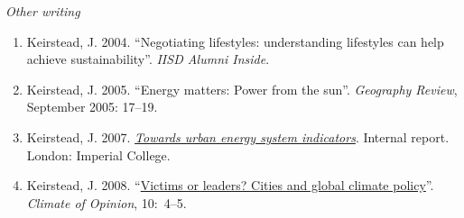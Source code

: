 \documentclass[11pt,a4paper]{article}
\begin{document}
\emph{Other writing}

\begin{enumerate}
\item Keirstead, J. 2004. ``Negotiating lifestyles: understanding lifestyles can help achieve sustainability''. \emph{IISD Alumni Inside}.

\item Keirstead, J. 2005. ``Energy matters: Power from the sun''.  \emph{Geography Review}, September 2005: 17--19.

\item Keirstead, J. 2007.  \href{http://www3.imperial.ac.uk/pls/portallive/docs/1/24897696.PDF}{\emph{Towards urban energy system indicators}}.  Internal report. London: Imperial College.

\item Keirstead, J. 2008. ``\href{http://www.stockholm-network.org/downloads/publications/Climate_of_Opinion_10.pdf}{Victims or leaders? Cities and global climate policy}''. \emph{Climate of Opinion}, 10:~4--5.

\end{enumerate}
\end{document}
